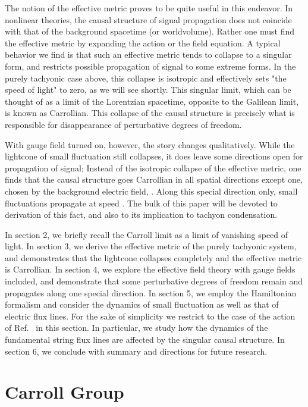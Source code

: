 \documentclass[a4paper,12pt]{article}
\begin{document}
The notion of the effective metric proves to be quite
useful in this endeavor. In nonlinear theories, the causal structure of 
signal propagation does not coincide with that of the background 
spacetime (or worldvolume). Rather one must find the effective 
metric by expanding the action or the field equation. A typical 
behavior we find is that such an effective metric tends to collapse 
to a singular form, and restricts possible propagation of signal 
to some extreme forms. In the purely tachyonic case above, this
collapse is isotropic and effectively sets "the speed of light"
to zero, as we will see shortly. This singular limit, which
can be thought of as a limit of the Lorentzian spacetime, opposite
to the Galilean limit, is known as Carrollian. This collapse
of the causal structure is precisely what is responsible for
disappearance of perturbative degrees of freedom.

With gauge field turned on, however, the story changes qualitatively.
While the lightcone of small fluctuation still collapses, it does
leave some directions open for propagation of signal; Instead of
the isotropic collapse of the effective metric, one finds that
the causal structure goes Carrollian in all spatial directions except 
one, chosen by the background electric field, \coordHE{}. Along this
special direction only, small fluctuations propagate at speed 
\coordHE{}. 
The bulk of this paper will be devoted to derivation of this fact, and
also to its implication to tachyon condensation.

In section 2, we briefly recall the Carroll limit as a limit of 
vanishing speed of light. In section 3, we derive the effective
metric of the purely tachyonic system, and demonstrates that the
lightcone collapses completely and the effective metric is 
Carrollian. In section 4, we explore the effective
field theory with gauge fields included, and demonstrate that
some perturbative degrees of freedom remain and propagates along
one special direction. In section 5, we employ the Hamiltonian formalism  
and consider the dynamics of small fluctuation as well as that of 
electric flux lines. For the sake of simplicity we restrict to the
case of the action of Ref.~\cite{bergshoeff} in this section.
In particular, we study how the dynamics of the fundamental string 
flux lines are affected by the singular causal structure.
In section 6, we conclude with summary and directions for future
research.


\section{Carroll Group}
\end{document}
